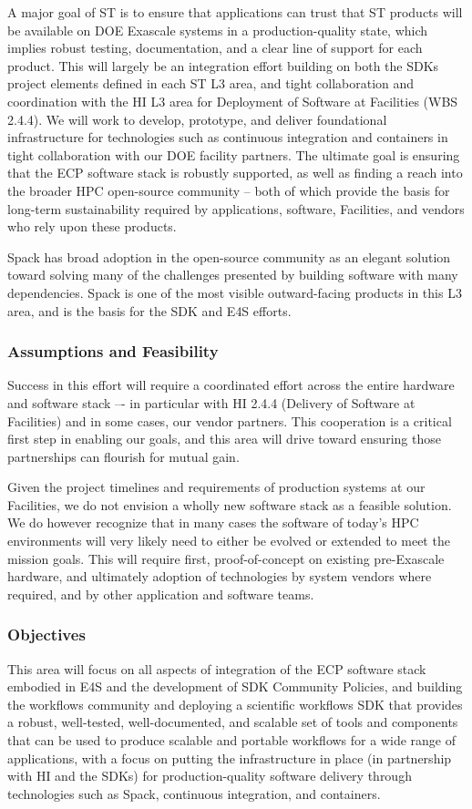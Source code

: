 A major goal of ST is to ensure that applications can trust that ST products will be available on DOE Exascale systems in a production-quality state, which implies robust testing, documentation, and a clear line of support for each product. This will largely be an integration effort building on both the SDKs project elements defined in each ST L3 area, and tight collaboration and coordination with the HI L3 area for Deployment of Software at Facilities (WBS 2.4.4). We will work to develop, prototype, and deliver foundational infrastructure for technologies such as continuous integration and containers in tight collaboration with our DOE facility partners. The ultimate goal is ensuring that the ECP software stack is robustly supported, as well as finding a reach into the broader HPC open-source community -- both of which provide the basis for long-term sustainability required by applications, software, Facilities, and vendors who rely upon these products.

Spack has broad adoption in the open-source community as an elegant solution toward solving many of the challenges presented by building software with many dependencies. Spack is one of the most visible outward-facing products in this L3 area, and is the basis for the SDK and E4S efforts.

\subsubsection{Assumptions and Feasibility}
Success in this effort will require a coordinated effort across the entire hardware and software stack –- in particular with HI 2.4.4 (Delivery of Software at Facilities) and in some cases, our vendor partners.  This cooperation is a critical first step in enabling our goals, and this area will drive toward ensuring those partnerships can flourish for mutual gain.

Given the project timelines and requirements of production systems at our Facilities, we do not envision a wholly new software stack as a feasible solution. We do however recognize that in many cases the software of today's HPC environments will very likely need to either be evolved or extended to meet the mission goals. This will require first, proof-of-concept on existing pre-Exascale hardware, and ultimately adoption of technologies by system vendors where required, and by other application and software teams.

\subsubsection{Objectives}
This area will focus on all aspects of integration of the ECP software stack embodied in E4S and the development of SDK Community Policies, and building the workflows community and deploying a scientific workflows SDK that provides a robust, well-tested, well-documented, and scalable set of tools and components that can be used to produce scalable and portable workflows for a wide range of applications, with a focus on putting the infrastructure in place (in partnership with HI and the SDKs) for production-quality software delivery through technologies such as Spack, continuous integration, and containers. 

